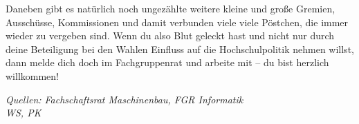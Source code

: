 Daneben gibt es natürlich noch ungezählte weitere kleine und große Gremien,
Ausschüsse, Kommissionen und damit verbunden viele viele Pöstchen, die immer 
wieder zu vergeben sind. Wenn du also Blut geleckt hast und nicht nur durch
deine Beteiligung bei den Wahlen Einfluss auf die Hochschulpolitik nehmen willst,
dann melde dich doch im Fachgruppenrat und arbeite mit -- du bist herzlich
willkommen!

\emph{Quellen: Fachschaftsrat Maschinenbau, FGR Informatik\\WS, PK}
